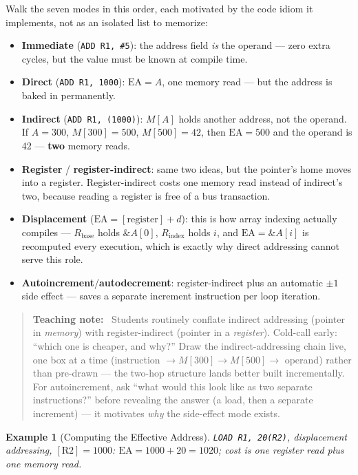 \documentclass[11pt]{article}
\newtheorem{example}{Example}[section]
\newenvironment{teachingaside}{\begin{quote}\small\color{primary-gold}\textbf{Teaching note:}\ }{\end{quote}}
\begin{document}
Walk the seven modes in this order, each motivated by the code idiom it implements, not as an isolated list to memorize:

\begin{itemize}
  \item \textbf{Immediate} (\texttt{ADD R1, \#5}): the address field \emph{is} the operand --- zero extra cycles, but the value must be known at compile time.
  \item \textbf{Direct} (\texttt{ADD R1, 1000}): $\text{EA} = A$, one memory read --- but the address is baked in permanently.
  \item \textbf{Indirect} (\texttt{ADD R1, (1000)}): $M[A]$ holds another address, not the operand. If $A = 300$, $M[300] = 500$, $M[500] = 42$, then $\text{EA} = 500$ and the operand is 42 --- \textbf{two} memory reads.
  \item \textbf{Register} / \textbf{register-indirect}: same two ideas, but the pointer's home moves into a register. Register-indirect costs one memory read instead of indirect's two, because reading a register is free of a bus transaction.
  \item \textbf{Displacement} ($\text{EA} = [\text{register}] + d$): this is how array indexing actually compiles --- $R_{\text{base}}$ holds $\&A[0]$, $R_{\text{index}}$ holds $i$, and $\text{EA} = \&A[i]$ is recomputed every execution, which is exactly why direct addressing cannot serve this role.
  \item \textbf{Autoincrement}/\textbf{autodecrement}: register-indirect plus an automatic $\pm 1$ side effect --- saves a separate increment instruction per loop iteration.
\end{itemize}

\begin{teachingaside}
Students routinely conflate indirect addressing (pointer in \emph{memory}) with register-indirect (pointer in a \emph{register}). Cold-call early: ``which one is cheaper, and why?'' Draw the indirect-addressing chain live, one box at a time (instruction $\to M[300] \to M[500] \to$ operand) rather than pre-drawn --- the two-hop structure lands better built incrementally. For autoincrement, ask ``what would this look like as two separate instructions?'' before revealing the answer (a load, then a separate increment) --- it motivates \emph{why} the side-effect mode exists.
\end{teachingaside}

\begin{example}[Computing the Effective Address]
\texttt{LOAD R1, 20(R2)}, displacement addressing, $[\text{R2}] = 1000$: $\text{EA} = 1000+20 = 1020$; cost is one register read plus one memory read.
\end{example}
\end{document}

